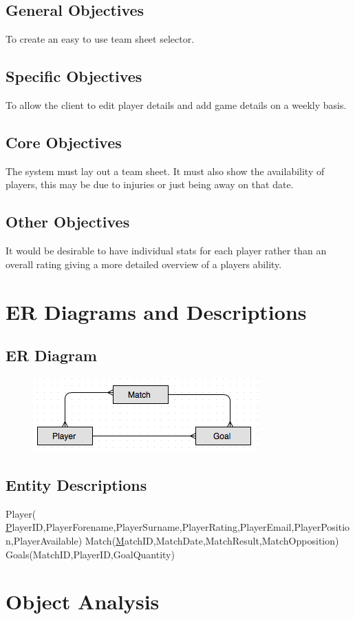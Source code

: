 \subsection{General Objectives}
To create an easy to use team sheet selector.
\subsection{Specific Objectives}
To allow the client to edit player details and add game details on a weekly basis.
\subsection{Core Objectives}
The system must lay out a team sheet. It must also show the availability of players, this may be due to injuries or just being away on that date.     
\subsection{Other Objectives}
It would be desirable to have individual stats for each player rather than an overall rating giving a more detailed overview of a players ability.
\section{ER Diagrams and Descriptions}

\subsection{ER Diagram}
\begin{figure}[H]
	\includegraphics{ER}
\end{figure}

\subsection{Entity Descriptions}
Player( {\ul PlayerID},PlayerForename,PlayerSurname,PlayerRating,PlayerEmail,PlayerPosition,PlayerAvailable)
Match({\ul MatchID},MatchDate,MatchResult,MatchOpposition)
Goals(MatchID,PlayerID,GoalQuantity)
\section{Object Analysis}


